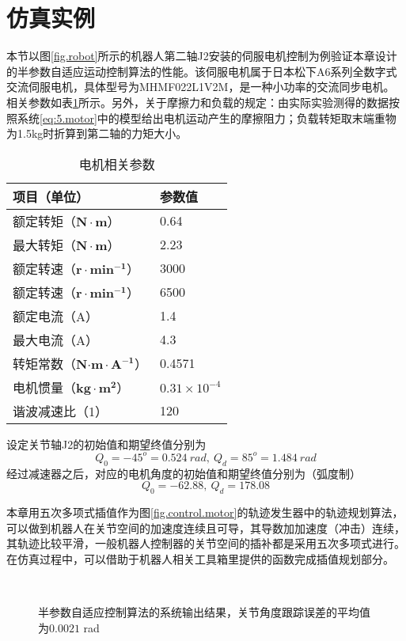 \section{仿真实例}
本节以图\ref{fig.robot}所示的机器人第二轴J2安装的伺服电机控制为例验证本章设计的半参数自适应运动控制算法的性能。该伺服电机属于日本松下A6系列全数字式交流伺服电机，具体型号为MHMF022L1V2M，是一种小功率的交流同步电机。相关参数如表\ref{tab:motor}所示。另外，关于摩擦力和负载的规定：由实际实验测得的数据按照系统\eqref{eq:5.motor}中的模型给出电机运动产生的摩擦阻力；负载转矩取末端重物为1.5kg时折算到第二轴的力矩大小。
\begin{table}
\centering
\caption{电机相关参数}\label{tab:motor}
\begin{tabular*}{0.9\textwidth}{@{\extracolsep{\fill}}ll}
\toprule
项目（单位）&参数值\\
\midrule
额定转矩（$\mathbf{N\cdot m}$）&0.64\\
最大转矩（$\mathbf{N\cdot m}$）&2.23\\
额定转速（$\mathbf{r\cdot min^{-1}}$）&3000\\
额定转速（$\mathbf{r\cdot min^{-1}}$）&6500\\
额定电流（A）&1.4\\
最大电流（A）&4.3\\
转矩常数（$\mathbf{N{\cdot m\cdot A^{-1}}} $）& 0.4571\\
电机惯量（$\mathbf{kg\cdot m^{2}}$）&$0.31\times10^{-4}$\\
谐波减速比（1）&120\\
\bottomrule
\end{tabular*}
\end{table}

设定关节轴J2的初始值和期望终值分别为
$$Q_{0}=-45^{o}=0.524\ rad,\ Q_{d}=85^{o}=1.484\ rad$$
经过减速器之后，对应的电机角度的初始值和期望终值分别为（弧度制）
$$Q_{0}=-62.88,\ Q_{d}=178.08$$

本章用五次多项式插值作为图\ref{fig.control.motor}的轨迹发生器中的轨迹规划算法，可以做到机器人在关节空间的加速度连续且可导，其导数加加速度（冲击）连续，其轨迹比较平滑，一般机器人控制器的关节空间的插补都是采用五次多项式进行。在仿真过程中，可以借助于机器人相关工具箱里提供的函数完成插值规划部分。

\begin{figure}[!htb]
	\centering
	\\
	\caption{半参数自适应控制算法的系统输出结果，关节角度跟踪误差的平均值为$0.0021$ rad}
	\label{fig.sim.semi.yye}
\end{figure}

